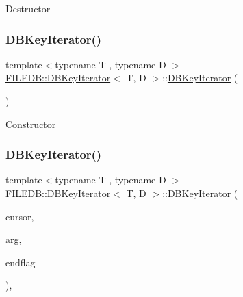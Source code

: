 Destructor \mbox{\label{classFILEDB_1_1DBKeyIterator_aece085c0a59d87759e01613b5c64ef36}} 
\subsubsection{\texorpdfstring{DBKeyIterator()}{DBKeyIterator()}\hspace{0.1cm}{\footnotesize\ttfamily [7/9]}}
{\footnotesize\ttfamily template$<$typename T , typename D $>$ \\
\mbox{\hyperlink{classFILEDB_1_1DBKeyIterator}{F\+I\+L\+E\+D\+B\+::\+D\+B\+Key\+Iterator}}$<$ T, D $>$\+::\mbox{\hyperlink{classFILEDB_1_1DBKeyIterator}{D\+B\+Key\+Iterator}} (\begin{DoxyParamCaption}\item[{void}]{ }\end{DoxyParamCaption})\hspace{0.3cm}{\ttfamily [inline]}}

Constructor \mbox{\label{classFILEDB_1_1DBKeyIterator_a7dc82bdde4a77bcadd704a3e87f6534a}} 
\subsubsection{\texorpdfstring{DBKeyIterator()}{DBKeyIterator()}\hspace{0.1cm}{\footnotesize\ttfamily [8/9]}}
{\footnotesize\ttfamily template$<$typename T , typename D $>$ \\
\mbox{\hyperlink{classFILEDB_1_1DBKeyIterator}{F\+I\+L\+E\+D\+B\+::\+D\+B\+Key\+Iterator}}$<$ T, D $>$\+::\mbox{\hyperlink{classFILEDB_1_1DBKeyIterator}{D\+B\+Key\+Iterator}} (\begin{DoxyParamCaption}\item[{const \mbox{\hyperlink{classFILEDB_1_1DBCursor}{D\+B\+Cursor}} \&}]{cursor,  }\item[{const T \&}]{arg,  }\item[{int}]{endflag }\end{DoxyParamCaption})\hspace{0.3cm}{\ttfamily [inline]}, {\ttfamily [explicit]}}

